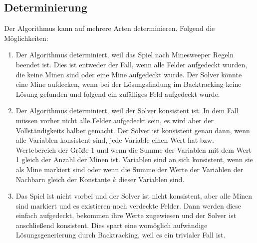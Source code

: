 \subsection{Determinierung}

Der Algorithmus kann auf mehrere Arten determinieren. Folgend die Möglichkeiten:
\begin{enumerate}
    \item Der Algorithmus determiniert, weil das Spiel nach Minesweeper Regeln beendet ist. Dies ist entweder der Fall, wenn alle Felder aufgedeckt
    wurden, die keine Minen sind oder eine Mine aufgedeckt wurde. Der Solver könnte eine Mine aufdecken, wenn bei der Lösungsfindung im Backtracking keine Lösung
    gefunden und folgend ein zufälliges Feld aufgedeckt wurde.\clearpage
    \item Der Algorithmus determiniert, weil der Solver konsistent ist. In dem Fall müssen vorher nicht alle Felder aufgedeckt sein, es wird
    aber der Vollständigkeits halber gemacht. Der Solver ist konsistent genau dann, wenn alle Variablen konsistent sind, 
    jede Variable einen Wert hat bzw. Wertebereich der Größe 1 und wenn die Summe der Variablen mit dem Wert 1 gleich der Anzahl der Minen ist.
    Variablen sind an sich konsistent, wenn sie als Mine markiert sind oder wenn die Summe der Werte der Variablen der Nachbarn gleich der
    Konstante $k$ dieser Variablen sind.
    \item Das Spiel ist nicht vorbei und der Solver ist nicht konsistent, aber alle Minen sind markiert und es existieren noch verdeckte Felder.
    Dann werden diese einfach aufgedeckt, bekommen ihre Werte zugewiesen und der Solver ist anschließend konsistent. Dies spart eine womöglich
    aufwändige Lösungsgenerierung durch Backtracking, weil es ein trivialer Fall ist.
\end{enumerate}
